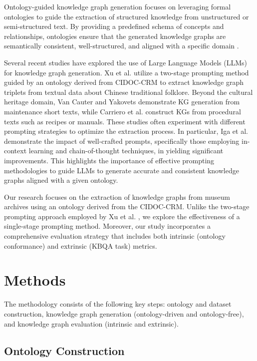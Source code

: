 \documentclass[a4, conference]{IEEEtran}
\begin{document}
Ontology-guided knowledge graph generation focuses on leveraging formal ontologies to guide the extraction of structured knowledge from unstructured or semi-structured text. By providing a predefined schema of concepts and relationships, ontologies ensure that the generated knowledge graphs are semantically consistent, well-structured, and aligned with a specific domain \cite{hofer2024constructionofknowledge}.

Several recent studies have explored the use of Large Language Models (LLMs) for knowledge graph generation. Xu et al. \cite{xu2024chattf} utilize a two-stage prompting method guided by an ontology derived from CIDOC-CRM to extract knowledge graph triplets from textual data about Chinese traditional folklore. Beyond the cultural heritage domain, Van Cauter and Yakovets \cite{cauter2024ontology} demonstrate KG generation from maintenance short texts, while Carriero et al. \cite{carriero2025humanevaluationofprocedural} construct KGs from procedural texts such as recipes or manuals. These studies often experiment with different prompting strategies to optimize the extraction process. In particular, Iga et al. \cite{iga2024assessllm} demonstrate the impact of well-crafted prompts, specifically those employing in-context learning and chain-of-thought techniques, in yielding significant improvements. This highlights the importance of effective prompting methodologies to guide LLMs to generate accurate and consistent knowledge graphs aligned with a given ontology.

Our research focuses on the extraction of knowledge graphs from museum archives using an ontology derived from the CIDOC-CRM. Unlike the two-stage prompting approach employed by Xu et al. \cite{xu2024chattf}, we explore the effectiveness of a single-stage prompting method. Moreover, our study incorporates a comprehensive evaluation strategy that includes both intrinsic (ontology conformance) and extrinsic (KBQA task) metrics.

\section{Methods}
\label{sec:methods}

The methodology consists of the following key steps: ontology and dataset construction, knowledge graph generation (ontology-driven and ontology-free), and knowledge graph evaluation (intrinsic and extrinsic).

\subsection{Ontology Construction}
\end{document}
